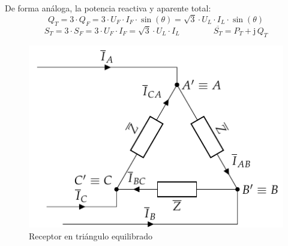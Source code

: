 	De forma análoga, la potencia reactiva y aparente total:
	\begin{equation}
	    \boxed{Q_T=3\cdot Q_F=3\cdot U_F\cdot {I_F}\cdot\sin(\theta)=\sqrt{3}\cdot U_L\cdot I_L\cdot\sin(\theta)}
	\end{equation}
	\begin{equation}
	    \boxed{S_T=3\cdot S_F=3\cdot U_F\cdot {I_F}=\sqrt{3}\cdot U_L\cdot I_L}  \qquad\qquad \boxed{\overline{S_T}=P_T+\mathrm{j}\,Q_T}
	\end{equation}
	
	\begin{figure}
	    \centering
	    \includegraphics{../figs/TrianguloEquilibrado_Receptor.pdf}
	    \caption{Receptor en triángulo equilibrado}
	    \label{fig.trianguloEquilibrado_receptor_potencia}
	\end{figure}
	
